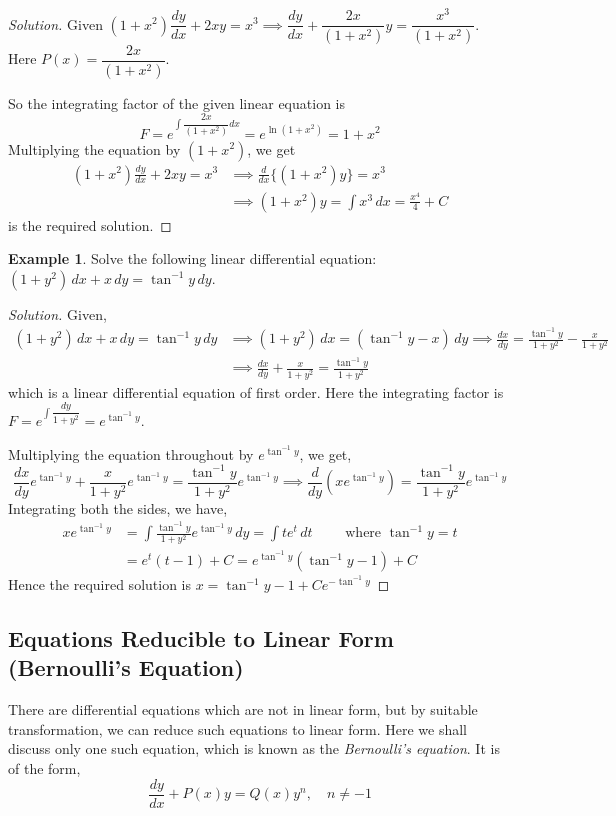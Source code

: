 \documentclass{book}
\theoremstyle{definition}
\newtheorem{example}{Example}[section]
\newenvironment{solution}
    {\begin{proof}[Solution]}
    {\end{proof}}
\begin{document}
\begin{solution}
Given $(1+x^2)\dfrac{dy}{dx}+2xy=x^3 \implies \dfrac{dy}{dx}+\dfrac{2x}{(1+x^2)}y=\dfrac{x^3}{(1+x^2)}$. Here $P(x)=\dfrac{2x}{(1+x^2)}$. 

So the integrating factor of the given linear equation is
\[
F=e^{\int\dfrac{2x}{(1+x^2)}dx}=e^{\ln(1+x^2)}=1+x^2
\]
Multiplying the equation by $(1+x^2)$, we get
\begin{align*}
    (1+x^2)\frac{dy}{dx}+2xy=x^3 &\implies \frac{d}{dx}\{(1+x^2)y\}=x^3 \\
    &\implies (1+x^2)y=\displaystyle\int x^3\,dx=\frac{x^4}{4}+C
\end{align*}
is the required solution.

\end{solution}

\begin{example}
Solve the following linear differential equation: $(1+y^2)\,dx+x\,dy=\tan^{-1}y\,dy$.    
\end{example}

\begin{solution}
Given,
\begin{align*}
(1+y^2)\,dx+x\,dy=\tan^{-1}y\,dy &\implies (1+y^2)\,dx=(\tan^{-1}y-x)\,dy \implies \frac{dx}{dy}=\frac{\tan^{-1}y}{1+y^2}-\frac{x}{1+y^2} \\ 
&\implies \frac{dx}{dy}+\frac{x}{1+y^2}=\frac{\tan^{-1}y}{1+y^2}
\end{align*}
which is a linear differential equation of first order. Here the integrating factor is $F=e^{\int\dfrac{dy}{1+y^2}}=e^{\tan^{-1}y}$. 

Multiplying the equation throughout by $e^{\tan^{-1}y}$, we get,
\[
\frac{dx}{dy}e^{\tan^{-1}y}+\frac{x}{1+y^2}e^{\tan^{-1}y}=\frac{\tan^{-1}y}{1+y^2}e^{\tan^{-1}y} \implies \frac{d}{dy}(xe^{\tan^{-1}y})=\frac{\tan^{-1}y}{1+y^2} e^{\tan^{-1}y}
\]
Integrating both the sides, we have,
\begin{align*}
xe^{\tan^{-1}y}&=\int\frac{\tan^{-1}y}{1+y^2} e^{\tan^{-1}y}\,dy=\displaystyle\int te^t\,dt \qquad \text{ where $\tan^{-1}y=t$} \\
&= e^t(t-1)+C=e^{\tan^{-1}y}(\tan^{-1}y-1)+C
\end{align*}
Hence the required solution is $x=\tan^{-1}y-1+Ce^{-\tan^{-1}y}$
\end{solution}

\subsection{Equations Reducible to Linear Form (Bernoulli's Equation)}
There are differential equations which are not in linear form, but by suitable transformation, we can reduce such equations to linear form. Here we shall discuss only one such equation, which is known as the \textit{Bernoulli's equation}. It is of the form,
\[
\frac{dy}{dx}+P(x)y=Q(x)y^n,\quad n\neq-1
\]
\end{document}

